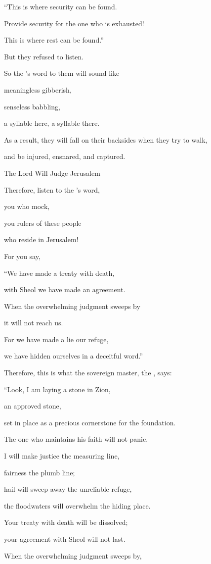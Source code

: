 {\par }{\Q “This
is where security
can be found.
\par }{\Q Provide security
for the one who is exhausted!
\par }{\Q This
is where rest
can be found.”

\par }{\Q But they refused
to listen.
\par }{\Q {}So the
{}’s
word
to them
will sound like
\par }{\Q meaningless
gibberish,
\par }{\Q senseless
babbling,
\par }{\Q a syllable here,
a syllable there.
\par }{\Q As a result, they will fall
on their backsides
when they try to walk,
\par }{\Q and be injured,
ensnared,
and captured.
\par }{\SH The Lord Will Judge Jerusalem
\par }{\Q {}Therefore,
listen
to the
{}’s
word,
\par }{\Q you who mock,
\par }{\Q you rulers
of these
people
\par }{\Q who
reside in Jerusalem!
\par }{\Q {}For
you say,
\par }{\Q “We have made
a treaty
with
death,
\par }{\Q with
Sheol
we have made
an agreement.
\par }{\Q When the overwhelming judgment
sweeps by
\par }{\Q it will not
reach
us.
\par }{\Q For
we have made
a lie
our refuge,
\par }{\Q we have hidden
ourselves in a deceitful word.”
\par }{\Q {}Therefore,
this is what
the sovereign
master, the
{},
says:
\par }{\Q “Look,
I am laying a stone
in Zion,
\par }{\Q an approved
stone,
\par }{\Q set in place as a precious
cornerstone
for the foundation.
\par }{\Q The one who maintains
his faith
will not
panic.
\par }{\Q {}I will make
justice
the measuring line,
\par }{\Q fairness
the plumb
line;
\par }{\Q hail
will sweep away
the unreliable
refuge,
\par }{\Q the floodwaters
will overwhelm
the hiding place.
\par }{\Q {}Your treaty
with
death
will be dissolved;
\par }{\Q your agreement
with
Sheol
will not
last.
\par }{\Q When the overwhelming
judgment
sweeps
by,

}
